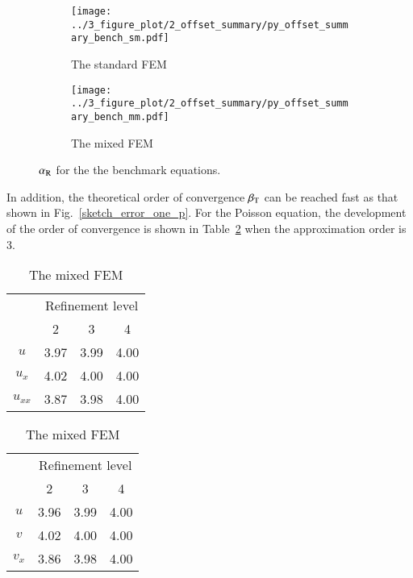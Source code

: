 \documentclass[review,3p]{elsarticle}
\begin{document}
\begin{figure}[!ht]
	\centering
    \begin{subfigure}{6.0cm}
        \texttt{[image: ../3\_figure\_plot/2\_offset\_summary/py\_offset\_summary\_bench\_sm.pdf]}
        \caption{The standard FEM}
        \label{py_offset_summary_bench_sm}
    \end{subfigure}
    \hspace{-0.2cm}
    \begin{subfigure}{6.0cm}
        \texttt{[image: ../3\_figure\_plot/2\_offset\_summary/py\_offset\_summary\_bench\_mm.pdf]}
        \caption{The mixed FEM}
        \label{py_offset_summary_bench_mm}
    \end{subfigure}
\caption{$\alpha_{\rm R}$ for the the benchmark equations.}
\label{py_offset_summary_bench}
\end{figure}

In addition, the theoretical order of convergence $\beta_{\rm T}$ can be reached fast as that shown in Fig.~\ref{sketch_error_one_p}. For the Poisson equation, the development of the order of convergence is shown in Table~\ref{evolution_convergence_order_sample_equations} when the approximation order is 3.

\newpage
\begin{table}[!ht]
\caption[sss]{An example for the evolution of the order of convergence.}
\label{evolution_convergence_order_sample_equations}
\hspace{3.5cm}
\begin{subtable}{0.4\textwidth}
\caption{The standard FEM}
 \begin{tabular}{c c c c} \hline
\multirow{2}{*}{} & \multicolumn{3}{c}{Refinement level} \\ \cline{2-4}
 & 2 & 3 & 4 \\	\hline
$u$ & 3.97 & 3.99 & 4.00 \\ 
$u_x$ & 4.02 & 4.00 & 4.00 \\ 
$u_{xx}$ & 3.87 & 3.98 & 4.00 \\ \hline
\end{tabular}
\end{subtable}
\hspace{-1.5cm}
\begin{subtable}{.4\textwidth}
\caption{The mixed FEM}
\begin{tabular}{c c c c} \hline
\multirow{2}{*}{} & \multicolumn{3}{c}{Refinement level} \\ \cline{2-4}
 & 2 & 3 & 4 \\	\hline
$u$ & 3.96 & 3.99 & 4.00 \\ 
$v$ & 4.02 & 4.00 & 4.00 \\ 
$v_{x}$ & 3.86 & 3.98 & 4.00 \\ \hline
\end{tabular}
\end{subtable}
\end{table}
\end{document}
